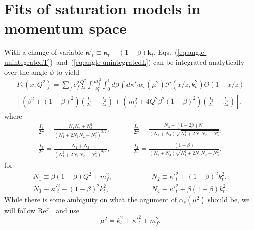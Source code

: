 \documentclass[11pt]{article}
\numberwithin{equation}{section}
\numberwithin{table}{section}
\numberwithin{figure}{section}
\begin{document}
\section{Fits of saturation models in momentum space}
%
With a change of variable  ${\boldsymbol{\kappa}'}_t\equiv{\boldsymbol{\kappa}_t}-(1-\beta)\mathbf{k}_t$, Eqs.~(\ref{eq:angle-unintegratedT})~and~(\ref{eq:angle-unintegratedL}) can be integrated analytically over the angle $\phi$ to yield~\cite{ Kimber:2001uaa,Kwiecinski:1997ee}
\begin{multline}
F_2(x,Q^2)=\sum_f e_f^2 \frac{Q^2}{2\pi}\int\frac{dk^2_t}{k_t^2}\int^1_0d\beta\int d{\kappa'}_t\alpha_s(\mu^2) \mathcal{F}(x/z,k_t^2)\Theta(1-x/z)\\
\left[\left(\beta^2+(1-\beta)^2\right)\left(\frac{I_1}{2\pi}-\frac{I_2}{2\pi}\right)
+\left(m_f^2+4Q^2\beta^2(1-\beta)^2\right)\left(\frac{I_3}{2\pi}-\frac{I_4}{2\pi}\right)\right],
\label{eq:angle-integrated}
\end{multline}
where %
\begin{equation}
\begin{split}
\frac{I_1}{2\pi}=\frac{N_1N_2+N_3^2}{\left( N^2_1+2N_1N_2+N_3^2\right)^{3/2}}, &\hspace{1cm}
\frac{I_2}{2\pi}=\frac{N_3-(1-2\beta)N_1}{(N_1+N_4)\sqrt{ N^2_1+2N_1N_2+N_3^2}},\\
\frac{I_3}{2\pi}=\frac{N_1+N_2}{\left( N^2_1+2N_1N_2+N_3^2\right)^{3/2}},&\hspace{1cm}
\frac{I_2}{2\pi}=\frac{(1-\beta)}{(N_1+N_4)\sqrt{ N^2_1+2N_1N_2+N_3^2}},
\end{split}
\end{equation}
for
\begin{equation}
\begin{split}
N_1\equiv\beta(1-\beta)Q^2+m_f^2, &\hspace{2cm}
N_2\equiv{\kappa'}_t^2+(1-\beta)^2k_t^2,\\
N_3\equiv{\kappa'}_t^2-(1-\beta)^2k_t^2, &\hspace{2cm}
N_4\equiv{\kappa'}_t^2+\beta(1-\beta)k_t^2.
\end{split}
\end{equation}
While there is some ambiguity on what the argument of $\alpha_s(\mu^2)$ should be, we will follow Ref.~\cite{Kwiecinski:1997ee} and use
\begin{equation}
\mu^2=k_t^2+{\kappa'}_t^2+m_f^2.
\end{equation}
\end{document}
